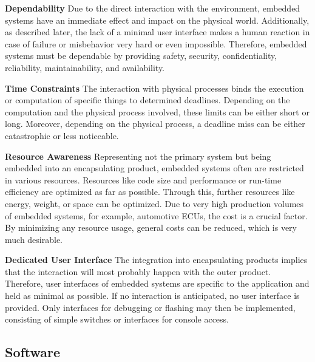            \noindent \textbf{Dependability} 
            Due to the direct interaction with the environment, embedded systems have an immediate effect and impact on the physical world.
            Additionally, as described later, the lack of a minimal user interface makes a human reaction in case of failure or misbehavior very hard or even impossible.
            Therefore, embedded systems must be dependable by providing safety, security, confidentiality, reliability, maintainability, and availability.
            
           \noindent \textbf{Time Constraints}
            The interaction with physical processes binds the execution or computation of specific things to determined deadlines.
            Depending on the computation and the physical process involved, these limits can be either short or long.
            Moreover, depending on the physical process, a deadline miss can be either catastrophic or less noticeable. 
            
           \noindent \textbf{Resource Awareness}
            Representing not the primary system but being embedded into an encapsulating product, embedded systems often are restricted in various resources.
            Resources like code size and performance or run-time efficiency are optimized as far as possible. 
            Through this, further resources like energy, weight, or space can be optimized.
            Due to very high production volumes of embedded systems, for example, automotive \acp{ECU}, the cost is a crucial factor.
            By minimizing any resource usage, general costs can be reduced, which is very much desirable.            

           \noindent \textbf{Dedicated User Interface}
            The integration into encapsulating products implies that the interaction will most probably happen with the outer product.
            Therefore, user interfaces of embedded systems are specific to the application and held as minimal as possible.
            If no interaction is anticipated, no user interface is provided. 
            Only interfaces for debugging or flashing may then be implemented, consisting of simple switches or interfaces for console access.
        
              
        \subsection{Software}
        \label{subsection:software}
        
